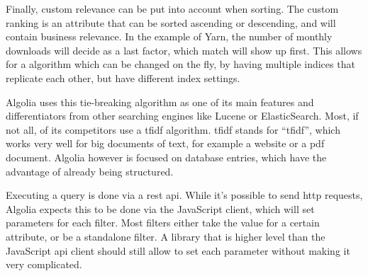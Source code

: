 Finally, custom relevance can be put into account when sorting. The custom ranking is an attribute that can be sorted ascending or descending, and will contain business relevance. In the example of Yarn, the number of monthly downloads will decide as a last factor, which match will show up first. This allows for a algorithm which can be changed on the fly, by having multiple indices that replicate each other, but have different index settings.

Algolia uses this tie-breaking algorithm as one of its main features and differentiators from other searching engines like Lucene or ElasticSearch. Most, if not all, of its competitors use a \acrshort{tfidf} algorithm. \acrshort{tfidf} stands for ``\acrlong{tfidf}'', which works very well for big documents of text, for example a website or a pdf document. Algolia however is focused on database entries, which have the advantage of already being structured.

Executing a query is done via a \acrshort{rest} \acrshort{api}. While it's possible to send \acrfull{http} requests, Algolia expects this to be done via the JavaScript client, which will set parameters for each filter. Most filters either take the value for a certain \gls{attribute}, or be a standalone filter. A library that is higher level than the JavaScript \acrshort{api} client should still allow to set each parameter without making it very complicated.
